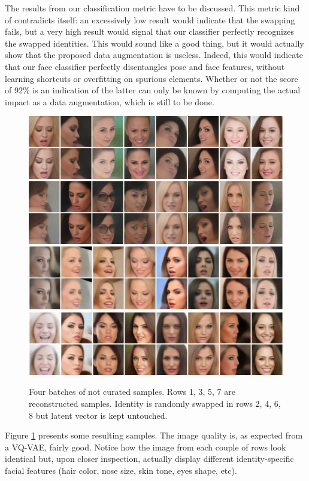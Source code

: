 The results from our classification metric have to be discussed. This metric kind of contradicts itself: an excessively low result would indicate that the swapping fails, but a very high result would signal that our classifier perfectly recognizes the swapped identities. This would sound like a good thing, but it would actually show that the proposed data augmentation is useless. Indeed, this would indicate that our face classifier perfectly disentangles pose and face features, without learning shortcuts or overfitting on spurious elements. Whether or not the score of 92\% is an indication of the latter can only be known by computing the actual impact as a data augmentation, which is still to be done.

\begin{figure}[ht]
    \centering
    \includegraphics[scale=1.5]{60-files/resampled-1.png}
    \includegraphics[scale=1.5]{60-files/resampled-2.png}
    \includegraphics[scale=1.5]{60-files/resampled-3.png}
    \includegraphics[scale=1.5]{60-files/resampled-4.png}
    \caption{Four batches of not curated samples. Rows 1, 3, 5, 7 are reconstructed samples. Identity is randomly swapped in rows 2, 4, 6, 8 but latent vector is kept untouched.}
    \label{fig:vqvae-facegen-samples}
\end{figure}

Figure \ref{fig:vqvae-facegen-samples} presents some resulting samples. The image quality is, as expected from a VQ-VAE, fairly good. Notice how the image from each couple of rows look identical but, upon closer inspection, actually display different identity-specific facial features (hair color, nose size, skin tone, eyes shape, etc).